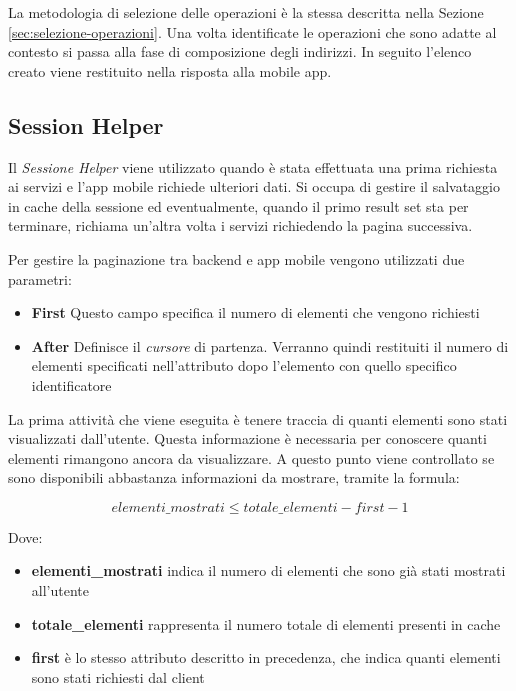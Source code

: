 La metodologia di selezione delle operazioni è la stessa descritta nella Sezione \ref{sec:selezione-operazioni}. Una volta identificate le operazioni che sono adatte al contesto si passa alla fase di composizione degli indirizzi. In seguito l'elenco creato viene restituito nella risposta alla mobile app.

\subsection{Session Helper\label{sec:session-helper}}

Il \emph{Sessione Helper} viene utilizzato quando è stata effettuata una prima richiesta ai servizi e l'app mobile richiede ulteriori dati. Si occupa di gestire il salvataggio in cache della sessione ed eventualmente, quando il primo result set sta per terminare, richiama un'altra volta i servizi richiedendo la pagina successiva.

Per gestire la paginazione tra backend e app mobile vengono utilizzati due parametri:

\begin{itemize}
	\item \textbf{First}
	Questo campo specifica il numero di elementi che vengono richiesti
	\item \textbf{After}
	Definisce il \emph{cursore} di partenza. Verranno quindi restituiti il numero di elementi specificati nell'attributo  dopo l'elemento con quello specifico identificatore
\end{itemize}

La prima attività che viene eseguita è tenere traccia di quanti elementi sono stati visualizzati dall'utente. Questa informazione è necessaria per conoscere quanti elementi rimangono ancora da visualizzare. A questo punto viene controllato se sono disponibili abbastanza informazioni da mostrare, tramite la formula:

\begin{equation}
	elementi\_mostrati \le totale\_elementi - first - 1
\end{equation}

Dove:

\begin{itemize}
	\item \textbf{elementi\_mostrati}
	indica il numero di elementi che sono già stati mostrati all'utente
	\item \textbf{totale\_elementi}
	rappresenta il numero totale di elementi presenti in cache
	\item \textbf{first}
	è lo stesso attributo descritto in precedenza, che indica quanti elementi sono stati richiesti dal client
\end{itemize}

